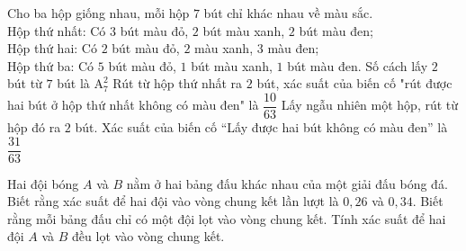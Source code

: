 \begin{ex}%
	Cho ba hộp giống nhau, mỗi hộp $7$ bút chỉ khác nhau về màu sắc.\\
	Hộp thứ nhất: Có $3$ bút màu đỏ, $2$ bút màu xanh, $2$ bút màu đen;\\
	Hộp thứ hai: Có $2$ bút màu đỏ, $2$ màu xanh, $3$ màu đen;\\
	Hộp thứ ba: Có $5$ bút màu đỏ, $1$ bút màu xanh, $1$ bút màu đen.
	{Số cách lấy $2$ bút từ $7$ bút là $\mathrm{A}_7^2$}
	{Rút từ hộp thứ nhất ra $2$ bút, xác suất của biến cố "rút được hai bút ở hộp thứ nhất không có màu đen" là $\dfrac{10}{63}$}
	{\True Lấy ngẫu nhiên một hộp, rút từ hộp đó ra $2$ bút. Xác suất của biến cố “Lấy được hai bút không có màu đen” là $\dfrac{31}{63}$}
\end{ex}

\begin{bt}%
	Hai đội bóng $A$ và $B$ nằm ở hai bảng đấu khác nhau của một giải đấu bóng đá. Biết rằng xác suất để hai đội vào vòng chung kết lần lượt là $0{,}26$ và $0{,}34$. Biết rằng mỗi bảng đấu chỉ có một đội lọt vào vòng chung kết. Tính xác suất để hai đội $A$ và $B$ đều lọt vào vòng chung kết.
\end{bt}

